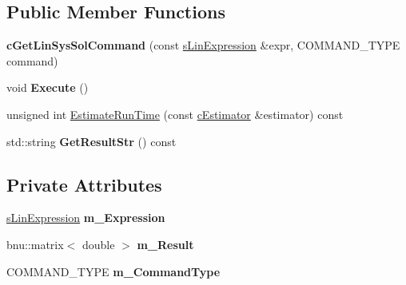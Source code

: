 \subsection*{Public Member Functions}
\begin{DoxyCompactItemize}
\item 
\hypertarget{classengine_1_1cGetLinSysSolCommand_ae3baefd62a4b417f86966b4e15c44271}{{\bfseries c\-Get\-Lin\-Sys\-Sol\-Command} (const \hyperlink{structengine_1_1sLinExpression}{s\-Lin\-Expression} \&expr, C\-O\-M\-M\-A\-N\-D\-\_\-\-T\-Y\-P\-E command)}\label{classengine_1_1cGetLinSysSolCommand_ae3baefd62a4b417f86966b4e15c44271}

\item 
\hypertarget{classengine_1_1cGetLinSysSolCommand_ab32459edc5b8caa48b73f5a35d7aa4a0}{void {\bfseries Execute} ()}\label{classengine_1_1cGetLinSysSolCommand_ab32459edc5b8caa48b73f5a35d7aa4a0}

\item 
unsigned int \hyperlink{classengine_1_1cGetLinSysSolCommand_a0307c18a7b86758e315e4c69c0b94a81}{Estimate\-Run\-Time} (const \hyperlink{classengine_1_1cEstimator}{c\-Estimator} \&estimator) const 
\item 
\hypertarget{classengine_1_1cGetLinSysSolCommand_a0312d6e933350085084813385bf1426c}{std\-::string {\bfseries Get\-Result\-Str} () const }\label{classengine_1_1cGetLinSysSolCommand_a0312d6e933350085084813385bf1426c}

\end{DoxyCompactItemize}
\subsection*{Private Attributes}
\begin{DoxyCompactItemize}
\item 
\hypertarget{classengine_1_1cGetLinSysSolCommand_a2cd2f7f001b7d2106544b1c7faba74df}{\hyperlink{structengine_1_1sLinExpression}{s\-Lin\-Expression} {\bfseries m\-\_\-\-Expression}}\label{classengine_1_1cGetLinSysSolCommand_a2cd2f7f001b7d2106544b1c7faba74df}

\item 
\hypertarget{classengine_1_1cGetLinSysSolCommand_ab59e6cfc596a16b20cddd0cd50c367b6}{bnu\-::matrix$<$ double $>$ {\bfseries m\-\_\-\-Result}}\label{classengine_1_1cGetLinSysSolCommand_ab59e6cfc596a16b20cddd0cd50c367b6}

\item 
\hypertarget{classengine_1_1cGetLinSysSolCommand_a3b01b22a5eb18d0272185b42c04ede6b}{C\-O\-M\-M\-A\-N\-D\-\_\-\-T\-Y\-P\-E {\bfseries m\-\_\-\-Command\-Type}}\label{classengine_1_1cGetLinSysSolCommand_a3b01b22a5eb18d0272185b42c04ede6b}

\end{DoxyCompactItemize}


